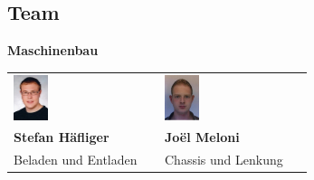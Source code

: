 \subsection{Team}

\large
\textbf{Maschinenbau}
\begin{table}[H]
\begin{tabular}{p{}p{}}	
	\includegraphics[width=0.25\textwidth]{./04_Projektmanagement/fig/stefanhaefliger.jpg}	&		\includegraphics[width=0.25\textwidth]{./04_Projektmanagement/fig/joelmeloni.jpg} 
	\\
	\textbf{Stefan Häfliger} & 	
	\textbf{Joël Meloni}
	\\
	Beladen und Entladen &
	Chassis und Lenkung
\end{tabular}
\end{table}


